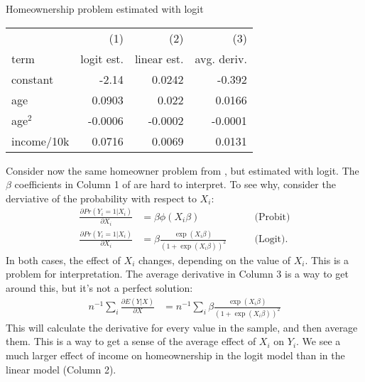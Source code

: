 \documentclass{tufte-handout}
\theoremstyle{break}
\newcommand{\continuation}{??}
\newenvironment{continueexample}[1]
 {\renewcommand{\continuation}{\ref{#1}}\excont[continued]}
 {\endexcont}
\begin{document}
\begin{margintable}
    \caption{Homeownership problem estimated with logit}
    \label{tab:logit_homeowner}
    \begin{tabular}{lrrr}
        & (1) & (2) & (3) \\
      term  &      logit est. & linear est. & avg. deriv. \\
      \midrule
      constant &      -2.14      &        0.0242 & -0.392 \\
      age      &         0.0903  &          0.022& 0.0166\\
      age$^{2}$ &          -0.0006&         -0.0002 & -0.0001\\
      income/10k     &       0.0716       &     0.0069 & 0.0131  
    \end{tabular}
\end{margintable}
\begin{boxD}
    \begin{continueexample}{example:homeownership}
        Consider now the same homeowner problem from , but estimated with logit.  The $\beta$ coefficients in Column 1 of  are hard to interpret. To see why, consider the derviative of the probability with respect to $X_{i}$: 
         \begin{align*}
            \frac{\partial Pr(Y_{i} = 1 | X_{i})}{\partial X_{i}} &= \beta\phi(X_{i}\beta) &\qquad \text{(Probit)}\\
            \frac{\partial Pr(Y_{i} = 1 | X_{i})}{\partial X_{i}} &= \beta \frac{\exp(X_{i}\beta)}{(1+\exp(X_{i}\beta))^{2}}  &\qquad \text{(Logit)}.
         \end{align*}
        In both cases, the effect of $X_{i}$ changes, depending on the value of $X_{i}$. This is a problem for interpretation.  The average derivative in Column 3 is a way to get around this, but it's not a perfect solution:
        \begin{align*}
        n^{-1}\sum_{i} \frac{\partial E(Y|X)}{\partial X} 
        &=n^{-1}\sum_{i} \beta \frac{\exp(X_{i}\beta)}{(1+\exp(X_{i}\beta))^{2}}
        \end{align*}
        This will calculate the derivative for every value in the sample, and then average them.  This is a way to get a sense of the average effect of $X_{i}$ on $Y_{i}$. We see a much larger effect of income on homeownership in the logit model than in the linear model (Column 2).
    \end{continueexample}
\end{boxD}
  
\end{document}
